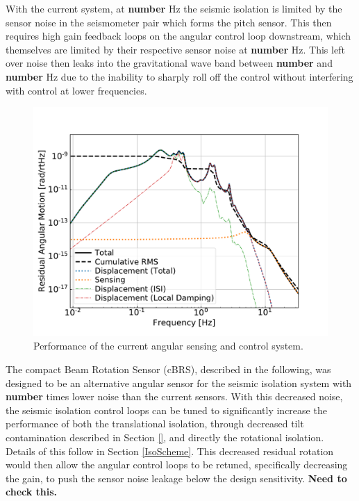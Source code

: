 \documentclass [12pt, proquest]{uwthesis}[2019]
\begin{document}
With the current system, at \textbf{number} Hz the seismic isolation is limited by the sensor noise in the seismometer pair which forms the pitch sensor. This then requires high gain feedback loops on the angular control loop downstream, which themselves are limited by their respective sensor noise at \textbf{number} Hz. This left over noise then leaks into the gravitational wave band between \textbf{number} and \textbf{number} Hz due to the inability to sharply roll off the control without interfering with control at lower frequencies.

\begin{figure}
\begin{center}
\includegraphics[width=\textwidth]{cBRS_ASC_Without.pdf}
\caption{Performance of the current angular sensing and control system.}
\label{ascWithout}
\end{center}
\end{figure}


The compact Beam Rotation Sensor (cBRS), described in the following, was designed to be an alternative angular sensor for the seismic isolation system with \textbf{number} times lower noise than the current sensors. With this decreased noise, the seismic isolation control loops can be tuned to significantly increase the performance of both the translational isolation, through decreased tilt contamination described in Section \ref{}, and directly the rotational isolation. Details of this follow in Section \ref{IsoScheme}. This decreased residual rotation would then allow the angular control loops to be retuned, specifically decreasing the gain, to push the sensor noise leakage below the design sensitivity. \textbf{Need to check this.}
\end{document}
